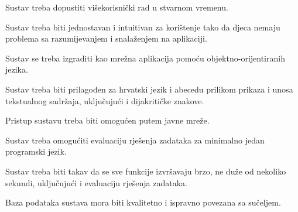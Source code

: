 			 \begin{packed_item}
			 	
			 	\item Sustav treba dopustiti višekorisnički rad u stvarnom vremenu.
			 	\item Sustav treba biti jednostavan i intuitivan za korištenje tako da djeca nemaju problema sa razumijevanjem i snalaženjem na aplikaciji.
			 	\item Sustav se treba izgraditi kao mrežna aplikacija pomoću objektno-orijentiranih jezika.
			 	\item Sustav treba biti prilagođen za hrvatski jezik i abecedu prilikom prikaza i unosa tekstualnog sadržaja, uključujući i dijakritičke znakove.
			 	\item Pristup sustavu treba biti omogućen putem javne mreže.
			 	\item Sustav treba omogućiti evaluaciju rješenja zadataka za minimalno jedan programski jezik.
			 	\item Sustav treba biti takav da se sve funkcije izvršavaju brzo, ne duže od nekoliko sekundi, uključujući i evaluaciju rješenja zadataka.
			 	\item Baza podataka sustava mora biti kvalitetno i ispravno povezana sa sučeljem.
			 	
			 \end{packed_item}
			 
	